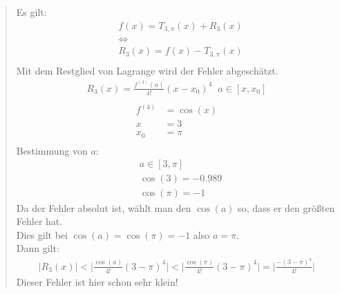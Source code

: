 \begin{quote}
Es gilt:\\
\begin{align*}
&f(x)=T_{3,\pi}(x)+R_3(x)\\
&\Leftrightarrow\\
&R_3(x)=f(x)-T_{3,\pi}(x)\\
\end{align*}
Mit dem Restglied von Lagrange wird der Fehler abgeschätzt.\\
\begin{align*}
R_3(x)=\frac{f^{(4)}(a)}{4!}(x-x_0)^{4}\;\;a\in[x,x_0]\\
\end{align*}
\begin{align*}
f^{(4)}&=\cos(x)\\
x&=3\\
x_0&=\pi\\
\end{align*}
Bestimmung von $ a $:\\
\begin{align*}
&a\in[3,\pi]\\
&\cos(3)=-0.989\\
&\cos(\pi)=-1
\end{align*}
Da der Fehler absolut ist, wählt man den $ \cos(a) $ so, dass er den größten Fehler hat.\\
Dies gilt bei $ \cos(a)=\cos(\pi)=-1 $ also $ a=\pi $.\\
Dann gilt:\\
\begin{align*}
\big|R_{3}(x)\big|<\bigg|\frac{\cos(a)}{4!}(3-\pi)^4\bigg|<\bigg|\frac{\cos(\pi)}{4!}(3-\pi)^4\bigg|=\bigg|\frac{-(3-\pi)^4}{4!}\bigg|
\end{align*}
Dieser Fehler ist hier schon sehr klein!\\
\end{quote}
